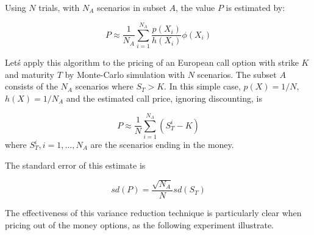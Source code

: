 \documentclass[12pt,]{tufte-book}
\begin{document}
Using \(N\) trials, with \(N_A\) scenarios in subset \(A\), the value \(P\) is estimated by:

\[
P \approx \frac{1}{N_A} \sum_{i=1}^{N_A} \frac{p(X_i)}{h(X_i)} \phi(X_i)
\]

Letś apply this algorithm to the pricing of an European call option with strike \(K\) and maturity \(T\) by Monte-Carlo simulation with \(N\) scenarios. The subset \(A\) consists of the \(N_A\) scenarios where \(S_T>K\). In this simple case, \(p(X)=1/N\), \(h(X)=1/N_A\) and the estimated call price, ignoring discounting, is

\[
P \approx \frac{1}{N} \sum_{i=1}^{N_A} (S_T^i - K)
\]
where \(S_T^i, i=1, \ldots, N_A\) are the scenarios ending in the money.

The standard error of this estimate is

\[
sd(P) =  \frac{\sqrt{N_A}}{N} sd(S_T)
\]

The effectiveness of this variance reduction technique is particularly clear when pricing out of the money options, as the following experiment illustrate.
\end{document}
